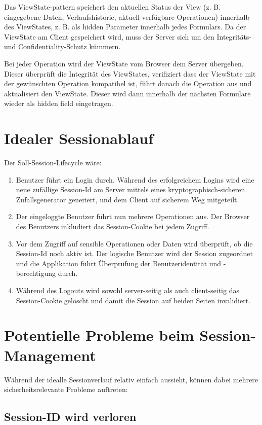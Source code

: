 Das ViewState-pattern speichert den aktuellen Status der View (z. B. eingegebene Daten, Verlaufshistorie, aktuell verfügbare Operationen) innerhalb des ViewStates, z. B. als hidden Parameter innerhalb jedes Formulars. Da der ViewState am Client gespeichert wird, muss der Server sich um den Integritäts- und Confidentiality-Schutz kümmern.

Bei jeder Operation wird der ViewState vom Browser dem Server übergeben. Dieser überprüft die Integrität des ViewStates, verifiziert dass der ViewState mit der gewünschten Operation kompatibel ist, führt danach die Operation aus und aktualisiert den ViewState. Dieser wird dann innerhalb der nächsten Formulare wieder als hidden field eingetragen.


\section{Idealer Sessionablauf}

Der Soll-Session-Lifecycle wäre:

\begin{enumerate}
	\item Benutzer führt ein Login durch. Während des erfolgreichem Logins wird eine neue zufällige Session-Id am Server mittels eines kryptographisch-sicheren Zufallsgenerator generiert, und dem Client auf sicherem Weg mitgeteilt.
	\item Der eingeloggte Benutzer führt nun mehrere Operationen aus. Der Browser des Benutzers inkludiert das Session-Cookie bei jedem Zugriff.
	\item Vor dem Zugriff auf sensible Operationen oder Daten wird überprüft, ob die Session-Id noch aktiv ist. Der logische Benutzer wird der Session zugeordnet und die Applikation führt Überprüfung der Benutzeridentität und -berechtigung durch.
	\item Während des Logouts wird sowohl server-seitig als auch client-seitig das Session-Cookie gelöscht und damit die Session auf beiden Seiten invalidiert.
\end{enumerate}

\section{Potentielle Probleme beim Session-Management}

Während der idealle Sessionverlauf relativ einfach aussieht, können dabei mehrere sicherheitsrelevante Probleme auftreten:

\subsection{Session-ID wird verloren}

